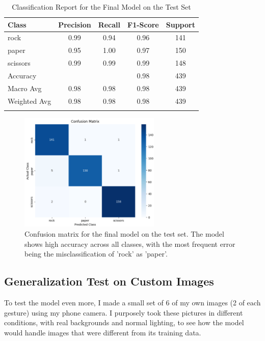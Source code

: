 \documentclass[pdflatex,sn-mathphys-num]{sn-jnl}%
\theoremstyle{thmstyleone}%
\theoremstyle{thmstyletwo}%
\theoremstyle{thmstylethree}%
\begin{document}
\begin{table}[htbp]
\caption{Classification Report for the Final Model on the Test Set}\label{tab:report}%
\begin{tabular}{@{}lcccc@{}}
\toprule
Class & Precision & Recall & F1-Score & Support \\
\midrule
rock     & 0.99 & 0.94 & 0.96 & 141 \\
paper    & 0.95 & 1.00 & 0.97 & 150 \\
scissors & 0.99 & 0.99 & 0.99 & 148 \\
\midrule
Accuracy &       &      & 0.98 & 439 \\
Macro Avg & 0.98 & 0.98 & 0.98 & 439 \\
Weighted Avg & 0.98 & 0.98 & 0.98 & 439 \\
\botrule
\end{tabular}
\end{table}

\begin{figure}[htbp]
\centering
\includegraphics[width=0.6\textwidth]{confusion_matrix.png}
\caption{Confusion matrix for the final model on the test set. The model shows high accuracy across all classes, with the most frequent error being the misclassification of 'rock' as 'paper'.}\label{fig:cm}
\end{figure}

\subsection{Generalization Test on Custom Images}
To test the model even more, I made a small set of 6 of my own images (2 of each gesture) using my phone camera. I purposely took these pictures in different conditions, with real backgrounds and normal lighting, to see how the model would handle images that were different from its training data.
\end{document}
